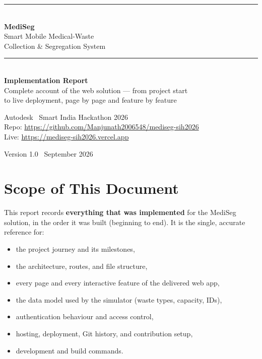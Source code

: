 \documentclass[11pt, a4paper]{article}
\begin{document}
\begin{titlepage}
\centering
\vspace*{2.2cm}

{\color{teal!50!white}\rule{\textwidth}{1pt}}\\[0.8em]
{\Huge\bfseries\textcolor{mediseg}{MediSeg}}\\[0.5em]
{\LARGE Smart Mobile Medical-Waste\\[0.3em] Collection \& Segregation System}\\[1.2em]
{\color{teal!50!white}\rule{\textwidth}{1pt}}\\[2.2em]

{\Large \textbf{Implementation Report}}\\[1.6em]
{\large Complete account of the web solution --- from project start\\[0.2em]
to live deployment, page by page and feature by feature}\\[3em]

\begin{minipage}{0.75\textwidth}
\centering
\small
Autodesk \textperiodcentered\ Smart India Hackathon 2026\\
Repo: \url{https://github.com/Manjunath2006548/mediseg-sih2026}\\
Live: \url{https://mediseg-sih2026.vercel.app}
\end{minipage}

\vfill
{\small Version 1.0 \textperiodcentered\ September 2026}
\end{titlepage}

\tableofcontents
\clearpage

\section{Scope of This Document}

This report records \textbf{everything that was implemented} for the MediSeg
solution, in the order it was built (beginning to end). It is the single,
accurate reference for:

\begin{itemize}[leftmargin=1.6em, itemsep=2pt]
  \item the project journey and its milestones,
  \item the architecture, routes, and file structure,
  \item every page and every interactive feature of the delivered web app,
  \item the data model used by the simulator (waste types, capacity, IDs),
  \item authentication behaviour and access control,
  \item hosting, deployment, Git history, and contribution setup,
  \item development and build commands.
\end{itemize}
\end{document}
